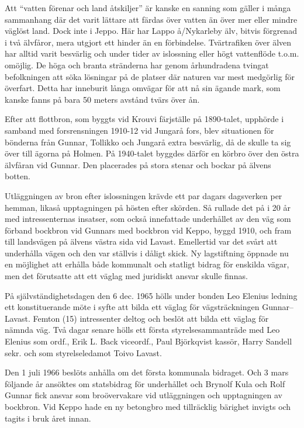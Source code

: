 Att ``vatten förenar och land åtskiljer'' är kanske en sanning som gäller i många sammanhang där det varit lättare att färdas över vatten än över mer eller mindre väglöst land. Dock inte i Jeppo. Här har Lappo å/Nykarleby älv, bitvis förgrenad i två älvfåror, mera utgjort ett hinder än en förbindelse. Tvärtrafiken över älven har alltid varit besvärlig och under tider av islossning eller högt vattenflöde t.o.m. omöjlig. De höga och branta stränderna har genom århundradena tvingat befolkningen att söka lösningar på de platser där naturen var mest medgörlig för överfart. Detta har inneburit långa omvägar för att nå sin ägande mark, som kanske fanns på bara 50 meters avstånd tvärs över ån.

Efter att flottbron, som byggts vid Krouvi färjställe på 1890-talet, upphörde i samband med forsrensningen 1910-12 vid Jungarå fors, blev situationen för bönderna från Gunnar, Tollikko och Jungarå extra besvärlig, då de skulle ta sig över till ägorna på Holmen. På 1940-talet byggdes därför en körbro över den östra älvfåran vid Gunnar. Den placerades på stora stenar och bockar på älvens botten.

Utläggningen av bron efter islossningen krävde ett par dagars dagsverken per hemman, likaså upptagningen på hösten efter skörden. Så rullade det på i 20 år med intressenternas insatser, som också innefattade underhållet av den väg som förband bockbron vid Gunnars med bockbron vid Keppo, byggd 1910, och fram till landsvägen på älvens västra sida vid Lavast. Emellertid var det svårt att underhålla vägen och den var ställvis i dåligt skick. Ny lagstiftning öppnade nu en möjlighet att erhålla både kommunalt och statligt bidrag för enskilda vägar, men det förutsatte att ett väglag med juridiskt ansvar skulle finnas.

På självständighetsdagen den 6 dec. 1965 hölls under bonden Leo Elenius ledning ett konstituerande möte i syfte att bilda ett väglag för vägsträckningen Gunnar--Lavast. Femton (15) intressenter deltog och beslöt att bilda ett väglag för nämnda väg. Två dagar senare hölls ett första styrelsesammanträde med Leo Elenius som ordf., Erik L. Back viceordf., Paul Björkqvist kassör, Harry Sandell sekr. och som styrelseledamot Toivo Lavast.

Den 1 juli 1966 beslöts anhålla om det första kommunala bidraget. Och 3 mars följande år ansöktes om statsbidrag för underhållet och Brynolf Kula och Rolf Gunnar fick ansvar som broövervakare vid utläggningen och upptagningen av bockbron. Vid Keppo hade en ny betongbro med tillräcklig bärighet invigts och tagits i bruk året innan.

